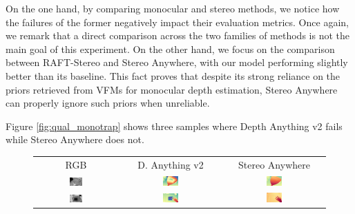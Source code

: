 \documentclass[10pt,twocolumn,letterpaper]{article}
\newcommand{\method}[0]{Stereo Anywhere\xspace}
\begin{document}
On the one hand, by comparing monocular and stereo methods, we notice how the failures of the former negatively impact their evaluation metrics. Once again, we remark that a direct comparison across the two families of methods is not the main goal of this experiment.
On the other hand, we focus on the comparison between RAFT-Stereo and \method, with our model performing slightly better than its baseline. This fact proves that despite its strong reliance on the priors retrieved from VFMs for monocular depth estimation, \method can properly ignore such priors when unreliable.

Figure \ref{fig:qual_monotrap} shows three samples where Depth Anything v2 fails while \method does not.

\begin{figure}[t]
    \centering
    \renewcommand{\tabcolsep}{1pt}
    \begin{tabular}{ccc}
        \small RGB &
        \small D. Anything v2 \cite{depth_anything_v2} &
        \method \\
        \includegraphics[width=0.16\textwidth]{imgs/monotrap_samples/rgb/13.jpg} &
        \includegraphics[width=0.16\textwidth]{imgs/monotrap_samples/mono/13.jpg} &
        \includegraphics[width=0.16\textwidth]{imgs/monotrap_samples/Ours/13.jpg} \\

        \includegraphics[width=0.16\textwidth]{imgs/monotrap_samples/rgb/2.jpg} &
        \includegraphics[width=0.16\textwidth]{imgs/monotrap_samples/mono/2.jpg} &
        \includegraphics[width=0.16\textwidth]{imgs/monotrap_samples/Ours/2.jpg} \\


\end{tabular}
\end{figure}
\end{document}

